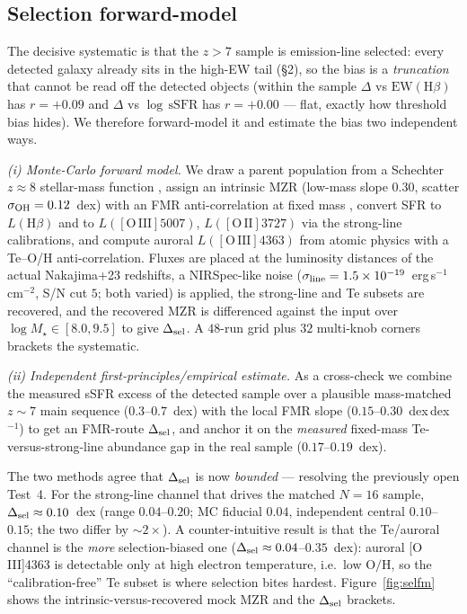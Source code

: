 \documentclass[twocolumn]{aastex631}
\begin{document}
\subsection{Selection forward-model}\label{sec:selfm}
The decisive systematic is that the $z>7$ sample is emission-line selected: every detected galaxy already sits in the high-EW tail (\S2), so the bias is a \emph{truncation} that cannot be read off the detected objects (within the sample $\Delta$ vs $\mathrm{EW}(\mathrm{H}\beta)$ has $r=+0.09$ and $\Delta$ vs $\log\,\mathrm{sSFR}$ has $r=+0.00$ --- flat, exactly how threshold bias hides). We therefore forward-model it and estimate the bias two independent ways.

\emph{(i) Monte-Carlo forward model.} We draw a parent population from a Schechter $z\approx8$ stellar-mass function \citep[$\log M_\star^\ast=10.0$, faint-end slope $\alpha=-1.9$, varied $-1.7\ldots-2.1$;][]{Song2016}, assign an intrinsic MZR (low-mass slope $0.30$, scatter $\sigma_{\rm OH}=0.12$~dex) with an FMR anti-correlation at fixed mass \citep[$\beta_{\rm FMR}=0.2$;][]{Mannucci2010,Sanders2021}, convert SFR to $L(\mathrm{H}\beta)$ \citep{KennicuttEvans2012} and to $L([\mathrm{O\,III}]5007)$, $L([\mathrm{O\,II}]3727)$ via the \citet{Curti2020} strong-line calibrations, and compute auroral $L([\mathrm{O\,III}]4363)$ from atomic physics \citep{Osterbrock2006} with a Te--O/H anti-correlation. Fluxes are placed at the luminosity distances of the actual Nakajima+23 redshifts, a NIRSpec-like noise ($\sigma_{\rm line}=1.5\times10^{-19}$~erg\,s$^{-1}$\,cm$^{-2}$, S/N cut $5$; both varied) is applied, the strong-line and Te subsets are recovered, and the recovered MZR is differenced against the input over $\log M_\star\in[8.0,9.5]$ to give $\Delta_{\rm sel}$. A $48$-run grid plus $32$ multi-knob corners brackets the systematic.

\emph{(ii) Independent first-principles/empirical estimate.} As a cross-check we combine the measured sSFR excess of the detected sample over a plausible mass-matched $z\sim7$ main sequence ($0.3$--$0.7$~dex) with the local FMR slope ($0.15$--$0.30$~dex\,dex$^{-1}$) to get an FMR-route $\Delta_{\rm sel}$, and anchor it on the \emph{measured} fixed-mass Te-versus-strong-line abundance gap in the real sample ($0.17$--$0.19$~dex).

The two methods agree that $\Delta_{\rm sel}$ is now \emph{bounded} --- resolving the previously open Test~4. For the strong-line channel that drives the matched $N=16$ sample, $\Delta_{\rm sel}\approx0.10$~dex (range $0.04$--$0.20$; MC fiducial $0.04$, independent central $0.10$--$0.15$; the two differ by $\sim2\times$). A counter-intuitive result is that the Te/auroral channel is the \emph{more} selection-biased one ($\Delta_{\rm sel}\approx0.04$--$0.35$~dex): auroral [O\,III]4363 is detectable only at high electron temperature, i.e.\ low $\mathrm{O/H}$, so the ``calibration-free'' Te subset is where selection bites hardest. Figure~\ref{fig:selfm} shows the intrinsic-versus-recovered mock MZR and the $\Delta_{\rm sel}$ brackets.
\end{document}
